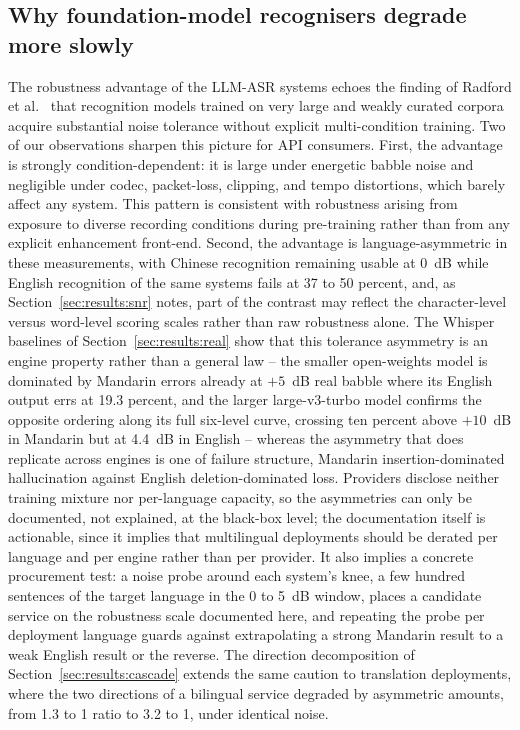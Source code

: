 \subsection{Why foundation-model recognisers degrade more slowly}

The robustness advantage of the LLM-ASR systems echoes the finding of
Radford et al.~\citep{radford2023robust} that recognition models trained on
very large and weakly curated corpora acquire substantial noise tolerance
without explicit multi-condition training. Two of our observations sharpen
this picture for API consumers. First, the advantage is strongly
condition-dependent: it is large under energetic babble noise and negligible
under codec, packet-loss, clipping, and tempo distortions, which barely
affect any system. This pattern is consistent with robustness arising from
exposure to diverse recording conditions during pre-training rather than
from any explicit enhancement front-end. Second, the advantage is
language-asymmetric in these measurements, with Chinese recognition
remaining usable at 0~dB
while English recognition of the same systems fails at 37 to 50 percent,
and, as Section~\ref{sec:results:snr} notes, part of the contrast may
reflect the character-level versus word-level scoring scales rather than
raw robustness alone. The Whisper baselines of
Section~\ref{sec:results:real} show that this tolerance asymmetry is an
engine property rather than a general law -- the smaller open-weights
model is dominated by Mandarin errors already at $+5$~dB real babble
where its English output errs at 19.3 percent, and the larger
large-v3-turbo model confirms the opposite ordering along its full
six-level curve, crossing ten percent above $+10$~dB in Mandarin but at
4.4~dB in English -- whereas the asymmetry that does
replicate across engines is one of failure structure, Mandarin
insertion-dominated hallucination against English deletion-dominated loss.
Providers
disclose neither training mixture nor per-language capacity, so the asymmetries
can only be documented, not explained, at the black-box level; the
documentation itself is actionable, since it implies that multilingual
deployments should be derated per language and per engine rather than per
provider. It also implies a concrete procurement test: a
noise probe around each system's knee, a few hundred sentences of the target
language in the 0 to 5~dB window, places a candidate service on the
robustness scale documented here, and repeating the probe per deployment
language guards against extrapolating a strong Mandarin result to a weak
English result or the reverse. The direction decomposition of
Section~\ref{sec:results:cascade} extends the same caution to translation
deployments, where the two directions of a bilingual service degraded by
asymmetric amounts, from 1.3 to 1 ratio to 3.2 to 1, under identical noise.

